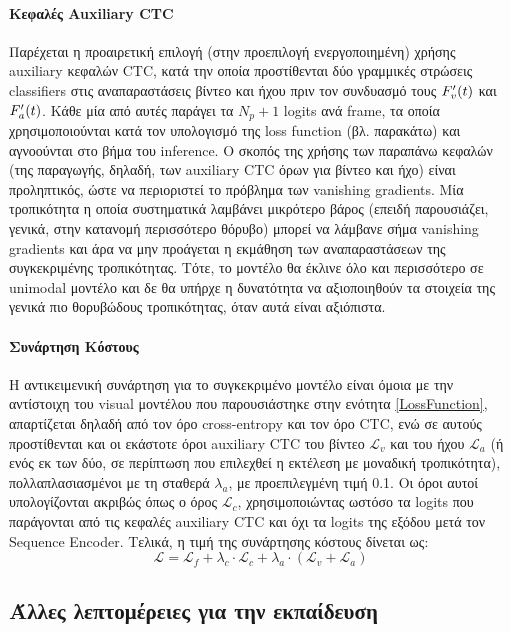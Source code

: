 \paragraph{Κεφαλές Auxiliary CTC}
Παρέχεται η προαιρετική επιλογή (στην προεπιλογή ενεργοποιημένη) χρήσης auxiliary κεφαλών CTC, κατά την οποία προστίθενται δύο γραμμικές στρώσεις classifiers στις αναπαραστάσεις βίντεο και ήχου πριν τον συνδυασμό τους $F_v\sp{\prime}(t)$ και $F_a\sp{\prime}(t)$. Κάθε μία από αυτές παράγει τα $N_p+1$ logits ανά frame, τα οποία χρησιμοποιούνται κατά τον υπολογισμό της loss function (βλ. παρακάτω) και αγνοούνται στο βήμα του inference. Ο σκοπός της χρήσης των παραπάνω κεφαλών (της παραγωγής, δηλαδή, των auxiliary CTC όρων για βίντεο και ήχο) είναι προληπτικός, ώστε να περιοριστεί το πρόβλημα των vanishing gradients. Μία τροπικότητα η οποία συστηματικά λαμβάνει μικρότερο βάρος (επειδή παρουσιάζει, γενικά, στην κατανομή περισσότερο θόρυβο) μπορεί να λάμβανε σήμα vanishing gradients και άρα να μην προάγεται η εκμάθηση των αναπαραστάσεων της συγκεκριμένης τροπικότητας. Τότε, το μοντέλο θα έκλινε όλο και περισσότερο σε unimodal μοντέλο και δε θα υπήρχε η δυνατότητα να αξιοποιηθούν τα στοιχεία της γενικά πιο θορυβώδους τροπικότητας, όταν αυτά είναι αξιόπιστα.

\paragraph{Συνάρτηση Κόστους}
Η αντικειμενική συνάρτηση για το συγκεκριμένο μοντέλο είναι όμοια με την αντίστοιχη του visual μοντέλου που παρουσιάστηκε στην ενότητα \ref{LossFunction}, απαρτίζεται δηλαδή από τον όρο cross-entropy και τον όρο CTC, ενώ σε αυτούς προστίθενται και οι εκάστοτε όροι auxiliary CTC του βίντεο $\mathcal{L}_v$ και του ήχου $\mathcal{L}_a$ (ή ενός εκ των δύο, σε περίπτωση που επιλεχθεί η εκτέλεση με μοναδική τροπικότητα), πολλαπλασιασμένοι με τη σταθερά $\lambda_a$, με προεπιλεγμένη τιμή 0.1. Οι όροι αυτοί υπολογίζονται ακριβώς όπως ο όρος $\mathcal{L}_c$, χρησιμοποιώντας ωστόσο τα logits που παράγονται από τις κεφαλές auxiliary CTC και όχι τα logits της εξόδου μετά τον Sequence Encoder. Τελικά, η τιμή της συνάρτησης κόστους δίνεται ως:
\[
\mathcal{L} = \mathcal{L}_f + \lambda_c \cdot \mathcal{L}_c + \lambda_a \cdot (\mathcal{L}_v + \mathcal{L}_a)
\]

\subsection{Άλλες λεπτομέρειες για την εκπαίδευση}
\label{TrainingDetails}

